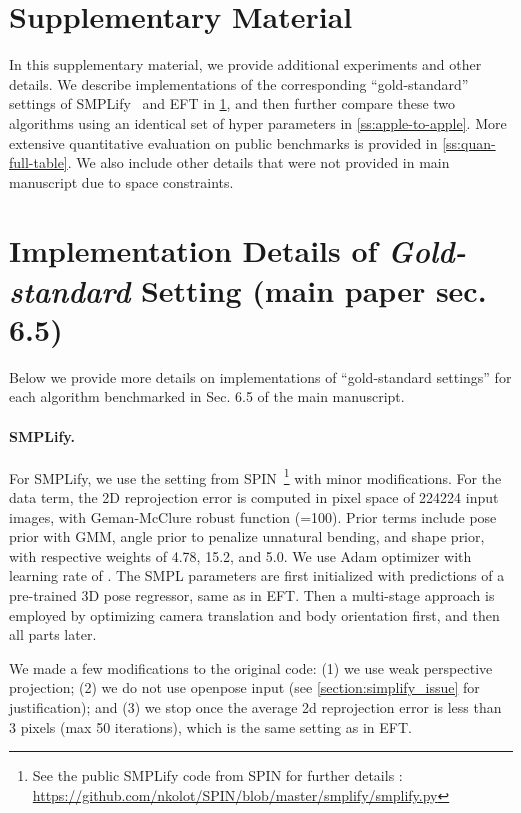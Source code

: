 \documentclass[10pt,twocolumn,letterpaper]{article}
\begin{document}
	
	
\newpage
	\section*{Supplementary Material}
	\renewcommand\thesection{\Alph{section}}
	\renewcommand{\thesubsection}{\alph{subsection}}
	\setcounter{section}{0}
	
	In this supplementary material, we provide additional experiments and other details. We describe implementations of the corresponding ``gold-standard'' settings of SMPLify~\cite{Bogo2016} and EFT in \cref{ss:gold-standard}, and then further compare these two algorithms using an identical set of hyper parameters in \cref{ss:apple-to-apple}. More extensive quantitative evaluation on public benchmarks is provided in \cref{ss:quan-full-table}. We also include other details that were not provided in main manuscript due to space constraints.
	
\section{Implementation Details of \emph{Gold-standard} Setting (main paper sec. 6.5)} \label{ss:gold-standard}
	Below we provide more details on implementations of ``gold-standard settings'' for each algorithm benchmarked in Sec. 6.5 of the main manuscript. 
	
	\paragraph{SMPLify.}
	For SMPLify, we use the setting from SPIN~\cite{kolotouros2019spin}\footnote{See the public SMPLify code from SPIN for further details : \url{https://github.com/nkolot/SPIN/blob/master/smplify/smplify.py}} with minor modifications. 
	For the data term, the 2D reprojection error is computed in pixel space of 224224 input images, with Geman-McClure robust function (=100). Prior terms include pose prior with GMM, angle prior to penalize unnatural bending, and shape prior, with respective weights of 4.78, 15.2, and 5.0.
	We use Adam optimizer with learning rate of . The SMPL parameters  are first initialized with predictions of a pre-trained 3D pose regressor, same as in EFT. Then a multi-stage approach is employed by optimizing camera translation and body orientation first, and then all parts later.
	
	We made a few modifications to the original code: (1) we use weak perspective projection; (2) we do not use openpose input (see \cref{section:simplify_issue} for justification); and (3) we stop once the average 2d reprojection error is less than 3 pixels (max 50 iterations), which is the same setting as in EFT.
	
\end{document}

